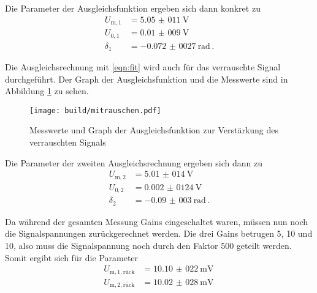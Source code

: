 Die Parameter der Ausgleichsfunktion ergeben sich dann konkret zu
\begin{align*}
  U_\mathrm{m,1} &= \SI{5,05(011)}{\volt} \,\\
  U_{0,1} &= \SI{0,01(009)}{\volt} \,\\
  \delta_1 &= \SI{-0,072(0027)}{\radian} \,.
\end{align*}

Die Ausgleichsrechnung mit \eqref{eqn:fit} wird auch für das verrauschte Signal durchgeführt.
Der Graph der Ausgleichsfunktion und die Messwerte sind in Abbildung \ref{fig:rausch}
zu sehen.

\begin{figure}
  \centering
  \texttt{[image: build/mitrauschen.pdf]}
  \caption{Messwerte und Graph der Ausgleichsfunktion zur Verstärkung des verrauschten Signals}
  \label{fig:rausch}
\end{figure}

Die Parameter der zweiten Ausgleichsrechnung ergeben sich dann zu
\begin{align*}
  U_\mathrm{m,2} &= \SI{5,01(014)}{\volt} \,\\
  U_{0,2} &= \SI{0,002(0124)}{\volt} \,\\
  \delta_2 &= \SI{-0,09(003)}{\radian} \,.
\end{align*}

Da während der gesamten Messung Gains eingeschaltet waren, müssen nun noch die
Signalspannungen zurückgerechnet werden. Die drei Gains betrugen 5, 10 und 10, also
muss die Signalspannung noch durch den Faktor 500 geteilt werden. Somit ergibt
sich für die Parameter
\begin{align}
  U_\mathrm{m,1,rück} &= \SI{10,10(022)}{\milli\volt} \,\\
  U_\mathrm{m,2,rück} &= \SI{10,02(028)}{\milli\volt} \,
\end{align}
